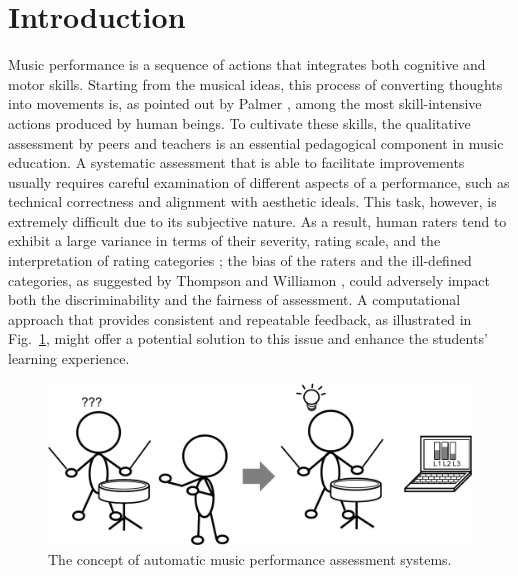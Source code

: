 \documentclass{ws-ijsc}
\begin{document}

\section{Introduction}
Music performance is a sequence of actions that integrates both cognitive and motor skills. Starting from the musical ideas, this process of converting thoughts into movements is, as pointed out by Palmer \cite{Palmer1997}, among the most skill-intensive actions produced by human beings. To cultivate these skills, the qualitative assessment by peers and teachers is an essential pedagogical component in music education. A systematic assessment that is able to facilitate improvements usually requires careful examination of different aspects of a performance, such as technical correctness and alignment with aesthetic ideals. This task, however, is extremely difficult due to its subjective nature. As a result, human raters tend to exhibit a large variance in terms of their severity, rating scale, and the interpretation of rating categories \cite{Wesolowski2016}; the bias of the raters and the ill-defined categories, as suggested by Thompson and Williamon \cite{Thompson2003}, could adversely impact both the discriminability and the fairness of assessment. A computational approach that provides consistent and repeatable feedback, as illustrated in Fig.~\ref{fig:basic_idea}, might offer a potential solution to this issue and enhance the students' learning experience. 

\begin{figure}
\centering
\includegraphics[width = \linewidth]{./figs/basic_idea.pdf}
\caption{The concept of automatic music performance assessment systems.}
\label{fig:basic_idea}
\end{figure}
\end{document}
